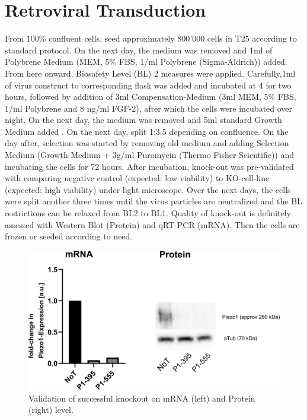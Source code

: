 \section{Retroviral Transduction}
From 100\% confluent cells, seed approximately 800'000 cells in T25 according to standard protocol. On the next day, the medium was removed and 1ml of Polybrene Medium (MEM\textalpha{}, 5\% FBS, 1\mul{}/ml Polybrene (Sigma-Aldrich)) added. From here onward, Biosafety Level (BL) 2 measures were applied. Carefully,1ml of virus construct to corresponding flask was added and incubated at 4 \degC for two hours, followed by addition of 3ml Compensation-Medium (3ml MEM\textalpha{}, 5\% FBS, 1\mul{}/ml Polybrene and 8 ng/ml FGF-2), after which the cells were incubated over night. On the next day, the medium was removed and 5ml standard Growth Medium added . On the next day, split 1:3.5 depending on confluence. On the day after, selection was started by removing old medium and adding Selection Medium (Growth Medium + 3\textmu{}g/ml Puromycin (Thermo Fisher Scientific)) and incubating the cells for 72 hours. After incubation, knock-out was pre-validated with comparing negative control (expected: low viability) to KO-cell-line (expected: high viability) under light microscope. Over the next days, the cells were split another three times until the virus particles are neutralized and the BL restrictions can be relaxed from BL2 to BL1. Quality of knock-out is definitely assessed with Western Blot (Protein) and qRT-PCR (mRNA). Then the cells are frozen or seeded according to need. 

\begin{figure}
    \centering
    \includegraphics[width=\linewidth]{Piezo1KO_Verification_WBandPCR.png}
    \caption{Validation of successful knockout on mRNA (left) and Protein (right) level.}
    \label{fig:KO-Verification}
\end{figure}

